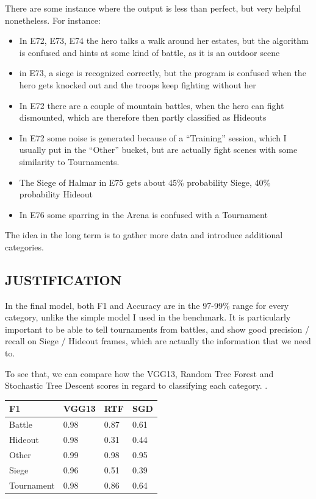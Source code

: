 \documentclass[
]{article}
\providecommand{\tightlist}{%
  \setlength{\itemsep}{0pt}\setlength{\parskip}{0pt}}
\begin{document}
There are some instance where the output is less than perfect, but very
helpful nonetheless. For instance:


\begin{itemize}
	\tightlist
	\item 
	In E72, E73, E74  the hero talks a walk around her estates, but the algorithm is confused and hints at some kind of battle, as it is an outdoor scene
	\item
	in E73, a siege is recognized correctly, but the program is confused
	when the hero gets knocked out and the troops keep fighting without
	her
	\item
	In E72 there are a couple of mountain battles, when the hero can fight
	dismounted, which are therefore then partly classified as Hideouts
	\item
	In E72 some noise is generated because of a ``Training'' session,
	which I usually put in the ``Other'' bucket, but are actually fight
	scenes with some similarity to Tournaments. 
	\item
	The Siege of Halmar in E75 gets about 45\% probability Siege, 40\%
	probability Hideout
	\item
	In E76 some sparring in the Arena is confused with a Tournament
\end{itemize}

The idea in the long term is to gather more data and introduce additional categories.


\hypertarget{justification}{%
\subsection{JUSTIFICATION}\label{justification}}

In the final model, both F1 and Accuracy are in the 97-99\% range for
every category, unlike the simple model I used in the benchmark. It is
particularly important to be able to tell tournaments from battles, and
show good precision / recall on Siege / Hideout frames, which are
actually the information that we need to.

To see that, we can compare how the VGG13, Random Tree Forest and
Stochastic Tree Descent scores in regard to classifying each
category. .

\begin{longtable}[]{@{}llll@{}}
\toprule
F1 & VGG13 & RTF & SGD\tabularnewline
\midrule
\endhead
Battle & 0.98 & 0.87 & 0.61\tabularnewline
Hideout & 0.98 & 0.31 & 0.44\tabularnewline
Other & 0.99 & 0.98 & 0.95\tabularnewline
Siege & 0.96 & 0.51 & 0.39\tabularnewline
Tournament & 0.98 & 0.86 & 0.64\tabularnewline
\bottomrule
\end{longtable}
\end{document}
